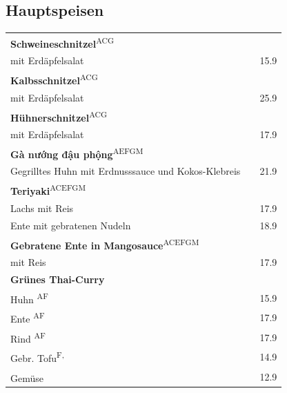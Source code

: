 \documentclass[a4paper,12pt]{article}
\newcommand{\vegan}{\textbf{\scriptsize \color{vegan}{Vegan}}}
\begin{document}
\begin{multicols}{2}
\section*{Hauptspeisen}
\begin{tabular}{Lrr}
\textbf{Schweineschnitzel}\textsuperscript{{\scriptsize ACG}}\\
\hspace{0.4cm}\scriptsize  mit Erdäpfelsalat & & 15.9\\
\textbf{Kalbsschnitzel}\textsuperscript{{\scriptsize ACG}}\\
\hspace{0.4cm}\scriptsize  mit Erdäpfelsalat & & 25.9\\
\textbf{Hühnerschnitzel}\textsuperscript{{\scriptsize ACG}}\\
\hspace{0.4cm}\scriptsize  mit Erdäpfelsalat & & 17.9\\
\textbf{Gà nướng đậu phộng}\textsuperscript{{\scriptsize AEFGM}}\\
\hspace{0.4cm}\scriptsize Gegrilltes Huhn mit Erdnusssauce und Kokos-Klebreis & & 21.9\\
\textbf{Teriyaki}\textsuperscript{{\scriptsize ACEFGM}}\\
\hspace{0.4cm}Lachs mit Reis & & 17.9\\
\hspace{0.4cm}Ente mit gebratenen Nudeln & & 18.9\\
\textbf{Gebratene Ente in Mangosauce}\textsuperscript{{\scriptsize ACEFGM}}\\
\hspace{0.4cm}\scriptsize mit Reis & & 17.9\\
\textbf{Grünes Thai-Curry}\\
\hspace{0.4cm}Huhn \textsuperscript{{\scriptsize AF}} & & 15.9\\
\hspace{0.4cm}Ente \textsuperscript{{\scriptsize AF}} & & 17.9\\
\hspace{0.4cm}Rind \textsuperscript{{\scriptsize AF}} & & 17.9\\
\hspace{0.4cm}Gebr. Tofu\textsuperscript{{\scriptsize F, \vegan}} & & 14.9\\
\hspace{0.4cm}Gemüse\textsuperscript{\vegan} & & 12.9\\

\end{tabular}
\end{multicols}
\end{document}

